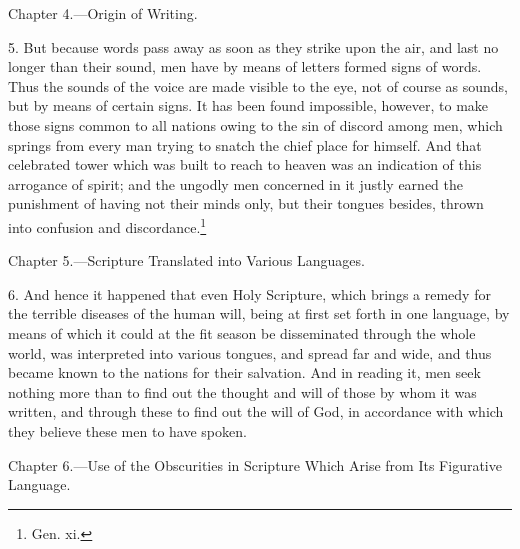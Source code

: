 
Chapter 4.—Origin of Writing.

5. But because words pass away as soon as they strike upon the air, and last no longer than their sound, men have by means of letters formed signs of words. Thus the sounds of the voice are made visible to the eye, not of course as sounds, but by means of certain signs. It has been found impossible, however, to make those signs common to all nations owing to the sin of discord among men, which springs from every man trying to snatch the chief place for himself. And that celebrated tower which was built to reach to heaven was an indication of this arrogance of spirit; and the ungodly men concerned in it justly earned the punishment of having not their minds only, but their tongues besides, thrown into confusion and discordance.\footnote{Gen. xi.}


Chapter 5.—Scripture Translated into Various Languages.

6. And hence it happened that even Holy Scripture, which brings a remedy for the terrible diseases of the human will, being at first set forth in one language, by means of which it could at the fit season be disseminated through the whole world, was interpreted into various tongues, and spread far and wide, and thus became known to the nations for their salvation. And in reading it, men seek nothing more than to find out the thought and will of those by whom it was written, and  through these to find out the will of God, in accordance with which they believe these men to have spoken.


Chapter 6.—Use of the Obscurities in Scripture Which Arise from Its Figurative Language.

